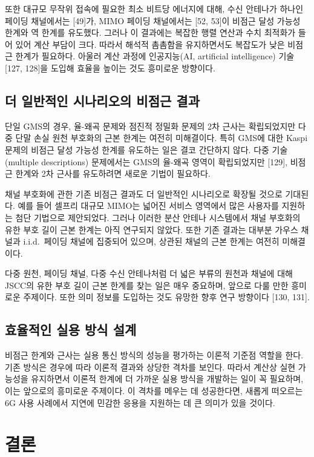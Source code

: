 또한 대규모 무작위 접속에 필요한 최소 비트당 에너지에 대해, 수신 안테나가 하나인 페이딩 채널에서는 [49]가, MIMO 페이딩 채널에서는 [52, 53]이 비점근 달성 가능성 한계와 역 한계를 유도했다. 그러나 이 결과에는 복잡한 행렬 연산과 수치 최적화가 들어 있어 계산 부담이 크다. 따라서 해석적 촘촘함을 유지하면서도 복잡도가 낮은 비점근 한계가 필요하다. 아울러 계산 과정에 인공지능(AI, artificial intelligence) 기술 [127, 128]을 도입해 효율을 높이는 것도 흥미로운 방향이다.

\subsection{더 일반적인 시나리오의 비점근 결과}

단일 GMS의 경우, 율-왜곡 문제와 점진적 정밀화 문제의 2차 근사는 확립되었지만 다중 단말 손실 원천 부호화의 근본 한계는 여전히 미해결이다. 특히 GMS에 대한 Kaspi 문제의 비점근 달성 가능성 한계를 유도하는 일은 결코 간단하지 않다. 다중 기술(multiple descriptions) 문제에서는 GMS의 율-왜곡 영역이 확립되었지만 [129], 비점근 한계와 2차 근사를 유도하려면 새로운 기법이 필요하다.

채널 부호화에 관한 기존 비점근 결과도 더 일반적인 시나리오로 확장될 것으로 기대된다. 예를 들어 셀프리 대규모 MIMO는 넓어진 서비스 영역에서 많은 사용자를 지원하는 첨단 기법으로 제안되었다. 그러나 이러한 분산 안테나 시스템에서 채널 부호화의 유한 부호 길이 근본 한계는 아직 연구되지 않았다. 또한 기존 결과는 대부분 가우스 채널과 i.i.d.\ 페이딩 채널에 집중되어 있으며, 상관된 채널의 근본 한계는 여전히 미해결이다.

다중 원천, 페이딩 채널, 다중 수신 안테나처럼 더 넓은 부류의 원천과 채널에 대해 JSCC의 유한 부호 길이 근본 한계를 찾는 일은 매우 중요하며, 앞으로 다룰 만한 흥미로운 주제이다. 또한 의미 정보를 도입하는 것도 유망한 향후 연구 방향이다 [130, 131].

\subsection{효율적인 실용 방식 설계}

비점근 한계와 근사는 실용 통신 방식의 성능을 평가하는 이론적 기준점 역할을 한다. 기존 방식은 경우에 따라 이론적 결과와 상당한 격차를 보인다. 따라서 계산상 실현 가능성을 유지하면서 이론적 한계에 더 가까운 실용 방식을 개발하는 일이 꼭 필요하며, 이는 앞으로의 흥미로운 주제이다. 이 격차를 메우는 데 성공한다면, 새롭게 떠오르는 6G 사용 사례에서 지연에 민감한 응용을 지원하는 데 큰 의미가 있을 것이다.

\section{결론}


